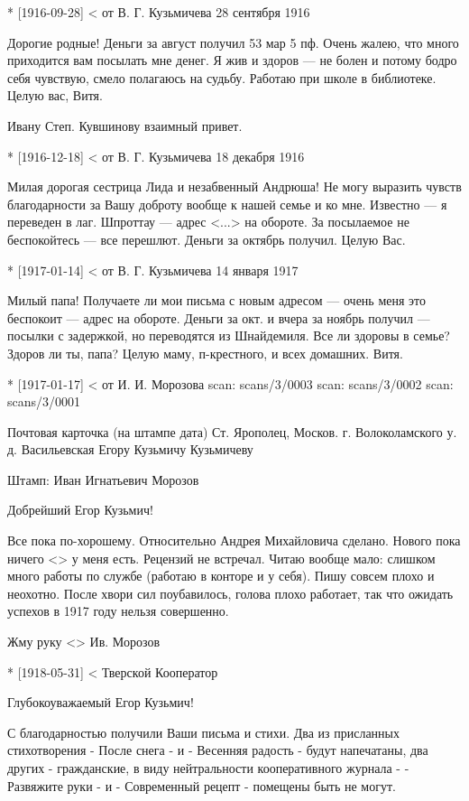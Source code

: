 * [1916-09-28] < от В. Г. Кузьмичева 
28 сентября 1916

Дорогие родные! Деньги за август получил 53 мар 5 пф. Очень жалею, что много приходится вам посылать мне денег. Я жив и здоров — не болен и потому бодро себя чувствую, смело полагаюсь на судьбу. Работаю при школе в библиотеке. Целую вас, Витя.

Ивану Степ. Кувшинову взаимный привет.

* [1916-12-18] < от В. Г. Кузьмичева 
18 декабря 1916

Милая дорогая сестрица Лида и незабвенный Андрюша! Не могу выразить чувств благодарности за Вашу доброту вообще к нашей семье и ко мне. Известно — я переведен в лаг. Шпроттау — адрес <...> на обороте. За посылаемое не беспокойтесь — все перешлют. Деньги за октябрь получил. Целую Вас.



* [1917-01-14] < от В. Г. Кузьмичева 
14 января 1917

Милый папа! Получаете ли мои письма с новым адресом — очень меня это беспокоит — адрес на обороте. Деньги за окт. и вчера за ноябрь получил — посылки с задержкой, но переводятся из Шнайдемиля. Все ли здоровы в семье? Здоров ли ты, папа? Целую маму, п-крестного, и всех домашних. Витя.


* [1917-01-17] < от И. И. Морозова
scan: scans/3/0003
scan: scans/3/0002
scan: scans/3/0001

Почтовая карточка (на штампе дата)
Ст. Ярополец, Москов. г. Волоколамского у. д. Васильевская
Егору Кузьмичу Кузьмичеву

Штамп: Иван Игнатьевич Морозов

Добрейший Егор Кузьмич!

Все пока по-хорошему. Относительно Андрея Михайловича сделано. Нового пока ничего <> у меня есть. Рецензий не встречал.
Читаю вообще мало: слишком много работы по службе (работаю в конторе и у себя). Пишу совсем плохо и неохотно. После хвори сил поубавилось, голова плохо работает, так что ожидать успехов в 1917 году нельзя совершенно.

Жму руку <> Ив. Морозов


* [1918-05-31] < Тверской Кооператор

Глубокоуважаемый Егор Кузьмич!

С благодарностью получили Ваши письма и стихи. Два из присланных стихотворения - После снега - и - Весенняя радость - будут напечатаны, два других - гражданские, в виду нейтральности кооперативного журнала - - Развяжите руки - и - Современный рецепт - помещены быть не могут.

